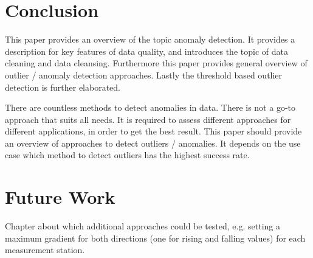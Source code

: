 \chapter{Conclusion}
This paper provides an overview of the topic anomaly detection. It provides a description for key features of data quality, and introduces the topic of data cleaning and data cleansing. Furthermore this paper provides general overview of outlier / anomaly detection approaches. Lastly the threshold based outlier detection is further elaborated.
\par
There are countless methods to detect anomalies in data. There is not a go-to approach that suits all needs. It is required to assess different approaches for different applications, in order to get the best result. This paper should provide an overview of approaches to detect outliers / anomalies. It depends on the use case which method to detect outliers has the highest success rate.  
\chapter{Future Work}
Chapter about which additional approaches could be tested, e.g. setting a maximum gradient for both directions (one for rising and falling values) for each measurement station. 
